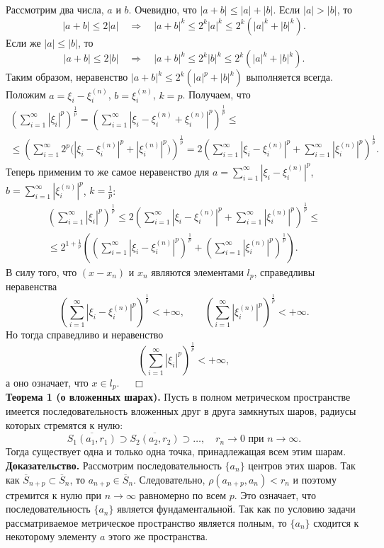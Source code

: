 \documentclass[12pt,a4paper, titlepage]{article}
\begin{document}
Рассмотрим два числа, $a$ и $b$. Очевидно, что $|a + b| \leqslant |a| + |b|$. Если $|a| > |b|$, то
$$
|a + b| \leqslant 2|a| \quad \Rightarrow \quad |a + b|^k \leqslant 2^k |a|^k \leqslant 2^k (|a|^k + |b|^k).
$$
Если же $|a| \leqslant |b|$, то
$$
|a + b| \leqslant 2|b| \quad \Rightarrow \quad |a + b|^k \leqslant 2^k |b|^k \leqslant 2^k (|a|^k + |b|^k).
$$
Таким образом, неравенство $|a + b|^k \leqslant 2^k (|a|^p + |b|^k)$ выполняется всегда. Положим $a = \xi_i - \xi_i^{(n)}$, $b = \xi_i^{(n)}$, $k = p$. Получаем, что
\begin{multline*}
\left( \sum_{i=1}^\infty | \xi_i |^p \right)^{\frac 1 p} = \left( \sum_{i=1}^\infty | \xi_i - \xi_i^{(n)} + \xi_i^{(n)} |^p \right)^{\frac 1 p} \leqslant \\
\leqslant \left( \sum_{i=1}^\infty 2^p \bigl( | \xi_i - \xi_i^{(n)} |^p + | \xi_i^{(n)} |^p \bigr) \right)^{\frac 1 p}
= 2 \left( \sum_{i=1}^\infty | \xi_i - \xi_i^{(n)} |^p + \sum_{i=1}^\infty | \xi_i^{(n)} |^p \right)^{\frac 1 p}.
\end{multline*}
Теперь применим то же самое неравенство для $a = \sum\limits_{i=1}^\infty | \xi_i - \xi_i^{(n)} |^p$, $b = \sum\limits_{i=1}^\infty | \xi_i^{(n)} |^p$, $k = \frac 1 p$:
\begin{multline*}
\left( \sum_{i=1}^\infty | \xi_i |^p \right)^{\frac 1 p} \leqslant
2 \left( \sum_{i=1}^\infty | \xi_i - \xi_i^{(n)} |^p + \sum_{i=1}^\infty | \xi_i^{(n)} |^p \right)^{\frac 1 p} \leqslant \\
\leqslant 2^{1 + \frac 1 p} \left( \left( \sum_{i=1}^\infty | \xi_i - \xi_i^{(n)} |^p \right)^{\frac 1 p} +
\left( \sum_{i=1}^\infty | \xi_i^{(n)} |^p \right)^{\frac 1 p} \right).
\end{multline*}
В силу того, что $(x - x_n)$ и $x_n$ являются элементами $l_p$, справедливы неравенства
$$
\left( \sum_{i=1}^\infty | \xi_i - \xi_i^{(n)} |^p \right)^{\frac 1 p} < + \infty, \qquad
\left( \sum_{i=1}^\infty | \xi_i^{(n)} |^p \right)^{\frac 1 p} < + \infty.
$$
Но тогда справедливо и неравенство
$$
\left( \sum_{i=1}^\infty | \xi_i |^p \right)^{\frac 1 p} < + \infty,
$$
а оно означает, что $x \in l_p$. $\quad \Box$\\

\textbf{Теорема 1 (о вложенных шарах).}
Пусть в полном метрическом пространстве имеется последовательность вложенных друг в друга замкнутых шаров, радиусы которых стремятся к нулю:
$$
\overline{S_1(a_1, r_1)} \supset \overline{S_2(a_2, r_2)} \supset \dots, \quad r_n \to 0 \mbox{ при } n\to\infty.
$$
Тогда существует одна и только одна точка, принадлежащая всем этим шарам.\\
\textbf{Доказательство.} Рассмотрим последовательность $\lbrace a_n \rbrace$ центров этих шаров. Так как $\overline{S}{}_{n+p} \subset \overline{S}{}_n$, то $a_{n+p} \in \overline{S}{}_n$. Следовательно, $\rho (a_{n+p}, a_n) < r_n$ и поэтому стремится к нулю при $n\to\infty$ равномерно по всем $p$. Это означает, что последовательность $\lbrace a_n \rbrace$ является фундаментальной. Так как по условию задачи рассматриваемое метрическое пространство является полным, то $\lbrace a_n \rbrace$ сходится к некоторому элементу $a$ этого же пространства.\\
\end{document}
